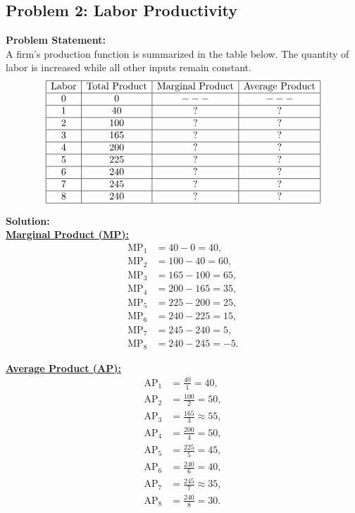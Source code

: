 \documentclass[12pt]{article}
\begin{document}
\subsection*{Problem 2: Labor Productivity}
\textbf{Problem Statement:} \\
A firm’s production function is summarized in the table below. The quantity of labor is increased while all other inputs remain constant.
\[
  \begin{array}{|c|c|c|c|}
    \hline
    \text{Labor} & \text{Total Product} & \text{Marginal Product} & \text{Average Product} \\
    \hline
    0 & 0   & --- & --- \\
    \hline
    1 & 40  & ?   & ? \\
    \hline
    2 & 100 & ?   & ? \\
    \hline
    3 & 165 & ?   & ? \\
    \hline
    4 & 200 & ?   & ? \\
    \hline
    5 & 225 & ?   & ? \\
    \hline
    6 & 240 & ?   & ? \\
    \hline
    7 & 245 & ?   & ? \\
    \hline
    8 & 240 & ?   & ? \\
    \hline
  \end{array}
\]
\medskip

\textbf{Solution:} \\
\underline{\textbf{Marginal Product (MP):}}
\begin{align*}
  \text{MP}_1 &= 40 - 0 = 40,\\[1mm]
  \text{MP}_2 &= 100 - 40 = 60,\\[1mm]
  \text{MP}_3 &= 165 - 100 = 65,\\[1mm]
  \text{MP}_4 &= 200 - 165 = 35,\\[1mm]
  \text{MP}_5 &= 225 - 200 = 25,\\[1mm]
  \text{MP}_6 &= 240 - 225 = 15,\\[1mm]
  \text{MP}_7 &= 245 - 240 = 5,\\[1mm]
  \text{MP}_8 &= 240 - 245 = -5.
\end{align*}

\underline{\textbf{Average Product (AP):}}
\begin{align*}
  \text{AP}_1 &= \frac{40}{1} = 40,\\[1mm]
  \text{AP}_2 &= \frac{100}{2} = 50,\\[1mm]
  \text{AP}_3 &= \frac{165}{3} \approx 55,\\[1mm]
  \text{AP}_4 &= \frac{200}{4} = 50,\\[1mm]
  \text{AP}_5 &= \frac{225}{5} = 45,\\[1mm]
  \text{AP}_6 &= \frac{240}{6} = 40,\\[1mm]
  \text{AP}_7 &= \frac{245}{7} \approx 35,\\[1mm]
  \text{AP}_8 &= \frac{240}{8} = 30.
\end{align*}
\medskip
\end{document}
